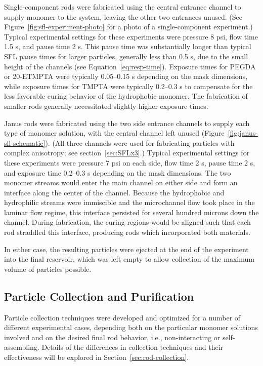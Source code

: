 Single-component rods were fabricated using the central entrance channel to supply monomer to the system, 
leaving the other two entrances unused. (See Figure~\ref{fig:sfl-experiment-photo} for a 
photo of a single-component experiment.)  Typical experimental settings for these experiments were pressure
8 psi, flow time 1.5 s, and pause time 2 s.  This pause time was substantially longer than
typical SFL pause times for larger particles, generally less than 0.5 s, due to the small
height of the channels (see Equation~\ref{eq:resp-time}).  Exposure times for PEGDA or 20-ETMPTA were typically 
0.05--0.15 s
depending on the mask dimensions, while exposure times for TMPTA were typically 0.2--0.3 s to compensate for
the less favorable curing behavior of the hydrophobic monomer.  The fabrication of smaller rods generally
necessitated slightly higher exposure times.  


Janus rods were fabricated using the two side entrance channels to supply each type of monomer solution,
with the central channel left unused (Figure~\ref{fig:janus-sfl-schematic}).  
(All three channels were used for fabricating
particles with complex anisotropy; see
section~\ref{sec:SFLx3}.)  Typical experimental settings for these experiments were pressure 7 psi on each side, 
flow time 2 s, pause time 2 s, and exposure time 0.2--0.3 s depending on the mask dimensions.
The two monomer streams would enter the main channel on either side and form
an interface along the center of the channel. Because the hydrophobic and
hydrophilic streams were immiscible and the microchannel flow took place in the laminar flow regime, 
this interface persisted for several hundred microns down the channel.
During fabrication, the curing regions would be aligned such that each rod straddled this interface,
producing rods which incorporated both materials.

In either case, the resulting particles were ejected at the end of the experiment into the final reservoir, which
was left empty to allow collection of the maximum volume of particles possible.

\subsection{Particle Collection and Purification}
\label{sec:exp-collection}

Particle collection techniques were developed and optimized for a number of different experimental cases,
depending both on the particular monomer solutions involved and on the desired final rod behavior, i.e., 
non-interacting or self-assembling.  Details of the differences
in collection techniques and their effectiveness will be explored in Section~\ref{sec:rod-collection}.

